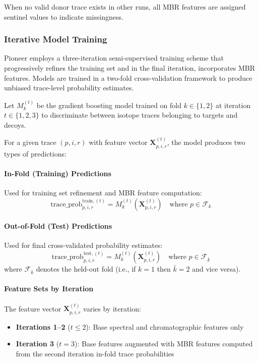 \documentclass[pdflatex,sn-nature]{sn-jnl}
\begin{document}
When no valid donor trace exists in other runs, all MBR features are assigned sentinel values to indicate missingness.

\subsubsection{Iterative Model Training}\label{subsubsec:iterative-model-training}

Pioneer employs a three-iteration semi-supervised training scheme that progressively refines the training set and in the final iteration, incorporates MBR features. Models are trained in a two-fold cross-validation framework to produce unbiased trace-level probability estimates.

Let $M_k^{(t)}$ be the gradient boosting model trained on fold $k \in \{1,2\}$ at iteration $t \in \{1,2,3\}$ to discriminate between isotope traces belonging to targets and decoys. 

For a given trace $(p,i,r)$ with feature vector $\mathbf{X}_{p,i,r}^{(t)}$, the model produces two types of predictions:

\paragraph{In-Fold (Training) Predictions}\label{para:in-fold-training-predictions} Used for training set refinement and MBR feature computation:
\begin{equation}
  \text{trace\_prob}_{p,i,r}^{\text{train},(t)} = M_k^{(t)}(\mathbf{X}_{p,i,r}^{(t)}) \quad \text{where } p \in \mathcal{F}_k
\end{equation}

\paragraph{Out-of-Fold (Test) Predictions}\label{para:out-of-fold-test-predictions} Used for final cross-validated probability estimates:
\begin{equation}
  \text{trace\_prob}_{p,i,r}^{\text{test},(t)} = M_k^{(t)}(\mathbf{X}_{p,i,r}^{(t)}) \quad \text{where } p \in \mathcal{F}_{\bar{k}}
\end{equation}
where $\mathcal{F}_{\bar{k}}$ denotes the held-out fold (i.e., if $k=1$ then $\bar{k}=2$ and vice versa).


\paragraph{Feature Sets by Iteration} \label{para:feature-sets-iter}
The feature vector $\mathbf{X}_{p,i,r}^{(t)}$ varies by iteration:
\begin{itemize}
  \item \textbf{Iterations 1--2} ($t \leq 2$): Base spectral and chromatographic features only
  \item \textbf{Iteration 3} ($t = 3$): Base features augmented with MBR features computed from the second iteration in-fold trace probabilities
\end{itemize}
\end{document}
